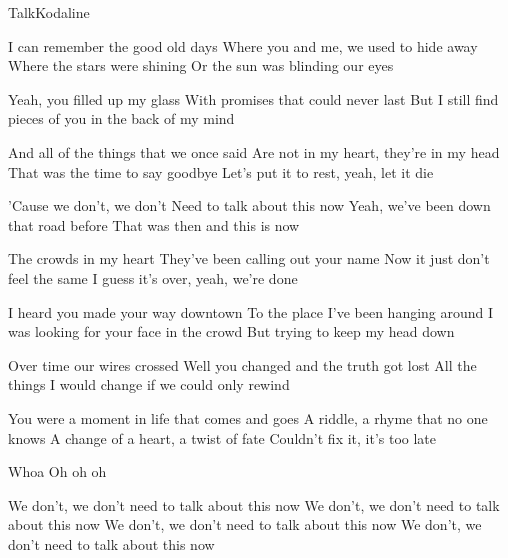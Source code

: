 \documentclass[a4paper,11pt,french]{article}
\begin{document}
\begin{Song}{Talk}{Kodaline}
\begin{multicols}{2}

\begin{Verse}
I can remember the good old days
Where you and me, we used to hide away
Where the stars were shining 
Or the sun was blinding our eyes
\espaceInterStrophe

Yeah, you filled up my glass
With promises that could never last
But I still find pieces of you in the back of my mind
\end{Verse}
\espaceInterStrophe

\begin{PreChorus}
And all of the things that we once said
Are not in my heart, they're in my head
That was the time to say goodbye
Let's put it to rest, yeah, let it die
\end{PreChorus}
\espaceInterStrophe

\begin{Chorus}
'Cause we don't, we don't 
Need to talk about this now
Yeah, we've been down that road before
That was then and this is now
\espaceInterStrophe

The crowds in my heart 
They've been calling out your name
Now it just don't feel the same
I guess it's over, yeah, we're done
\end{Chorus}
\vfill
\columnbreak

\begin{Verse}
I heard you made your way downtown
To the place I've been hanging around
I was looking for your face in the crowd
But trying to keep my head down
\espaceInterStrophe

Over time our wires crossed
Well you changed and the truth got lost
All the things I would change if we could only rewind
\end{Verse}
\espaceInterStrophe

\begin{PreChorus}
You were a moment in life that comes and goes
A riddle, a rhyme that no one knows
A change of a heart, a twist of fate
Couldn't fix it, it's too late
\end{PreChorus}
\espaceInterStrophe

\tochorus
\espaceInterStrophe

\begin{Chorus}
Whoa
Oh oh oh
\espaceInterStrophe

We don't, we don't 
need to talk about this now
We don't, we don't 
need to talk about this now
We don't, we don't 
need to talk about this now
We don't, we don't 
need to talk about this now
\end{Chorus}
\espaceInterStrophe


\end{multicols}
\end{Song}
\end{document}
